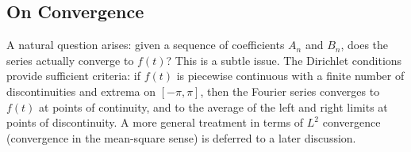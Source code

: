 \documentclass[]{article}
\begin{document}
\subsection{On Convergence}
A natural question arises: given a sequence of coefficients $A_n$ and $B_n$, does the series actually converge to $f(t)$? This is a subtle issue. The Dirichlet conditions provide sufficient criteria: if $f(t)$ is piecewise continuous with a finite number of discontinuities and extrema on $[-\pi, \pi]$, then the Fourier series converges to $f(t)$ at points of continuity, and to the average of the left and right limits at points of discontinuity. A more general treatment in terms of $L^2$ convergence (convergence in the mean-square sense) is deferred to a later discussion.
\end{document}
